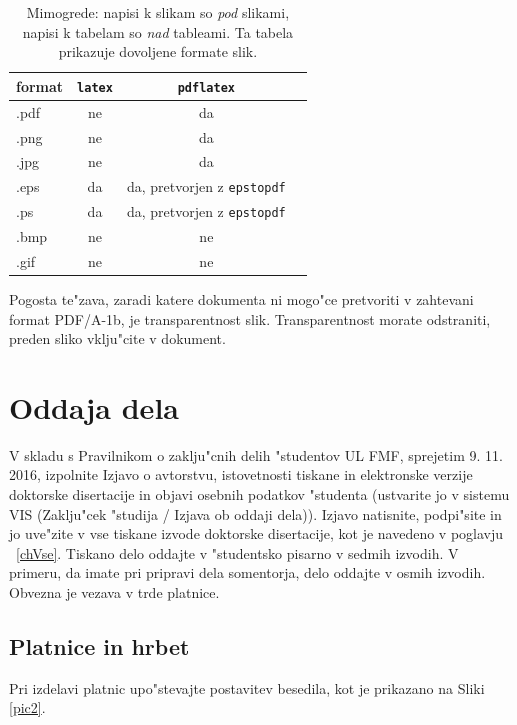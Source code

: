 \begin{table}[h]
\caption[Dovoljeni formati slik]{Mimogrede: napisi k slikam so {\sl pod\/} slikami, 
napisi k tabelam so {\sl nad\/} tableami.  Ta tabela prikazuje
dovoljene formate slik.}
\label{tbl1}
\begin{center}
\begin{tabular}{l|ccc}
format & {\tt latex}  & {\tt pdflatex} \\ \hline
.pdf & ne  & da  \\
.png & ne  & da  \\
.jpg & ne & da  \\
.eps & da & da, pretvorjen z {\tt epstopdf} \\
.ps & da & da, pretvorjen z {\tt epstopdf}  \\
.bmp & ne & ne \\
.gif & ne & ne 
\end{tabular}
\end{center}
\end{table}

Pogosta te"zava, zaradi katere dokumenta ni mogo"ce pretvoriti v zahtevani format PDF/A-1b, je transparentnost slik. 
Transparentnost morate odstraniti, preden sliko vklju"cite v dokument. 

%
\chapter{Oddaja dela}
\label{chOdd}

V skladu s Pravilnikom o zaklju"cnih delih "studentov \acs{UL} \acs{FMF}, sprejetim 9. 11. 2016, 
izpolnite Izjavo o avtorstvu, istovetnosti tiskane in elektronske verzije doktorske di\-sertacije in objavi osebnih podatkov "studenta
(ustvarite jo v sistemu \acs{VIS} (Zaklju"cek "studija / Izjava ob oddaji dela)).
Izjavo natisnite, podpi"site in jo uve"zite v vse tiskane izvode doktorske disertacije, kot je navedeno v poglavju ~\ref{chVse}. 
Tiskano delo oddajte v "studentsko pisarno v sedmih izvodih. V primeru, da imate pri pripravi dela somentorja, delo oddajte v osmih izvodih. 
Obvezna je vezava v trde platnice.

\section{Platnice in hrbet}

Pri izdelavi platnic upo"stevajte postavitev besedila, kot je prikazano na Sliki \ref{pic2}.

